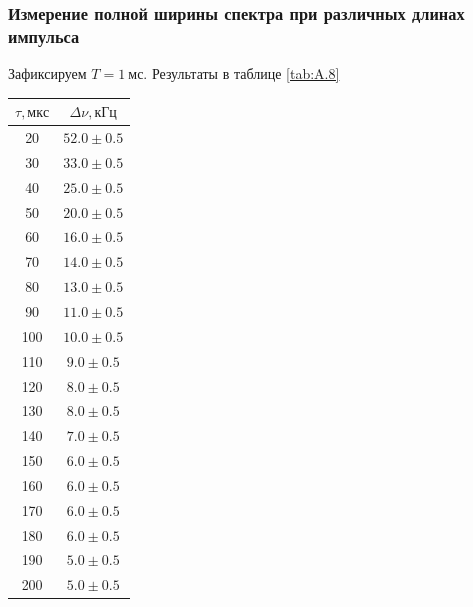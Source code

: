 \documentclass[a4paper, 12pt]{article}
\begin{document}
            \subsubsection{Измерение полной ширины спектра при различных длинах импульса}

                Зафиксируем $T = 1~мс$. Результаты в таблице \ref{tab:A.8}

                \begin{table}[ht]
                    \begin{minipage}[ht]{0.49\linewidth}
                        \centering
                        \begin{tabular}{|c|c|}
                            \hline

                            $\tau, мкс$ & $\Delta \nu, кГц$\\ \hline
                            20 & $52.0 \pm 0.5$\\ \hline
                            30 & $33.0 \pm 0.5$\\ \hline
                            40 & $25.0 \pm 0.5$\\ \hline
                            50 & $20.0 \pm 0.5$\\ \hline
                            60 & $16.0 \pm 0.5$\\ \hline
                            70 & $14.0 \pm 0.5$\\ \hline
                            80 & $13.0 \pm 0.5$\\ \hline
                            90 & $11.0 \pm 0.5$\\ \hline
                            100 & $10.0 \pm 0.5$\\ \hline
                            110 & $9.0 \pm 0.5$\\ \hline
                            120 & $8.0 \pm 0.5$\\ \hline
                            130 & $8.0 \pm 0.5$\\ \hline
                            140 & $7.0 \pm 0.5$\\ \hline
                            150 & $6.0 \pm 0.5$\\ \hline
                            160 & $6.0 \pm 0.5$\\ \hline
                            170 & $6.0 \pm 0.5$\\ \hline
                            180 & $6.0 \pm 0.5$\\ \hline
                            190 & $5.0 \pm 0.5$\\ \hline
                            200 & $5.0 \pm 0.5$\\ \hline


\end{tabular}
\end{minipage}
\end{table}
\end{document}
